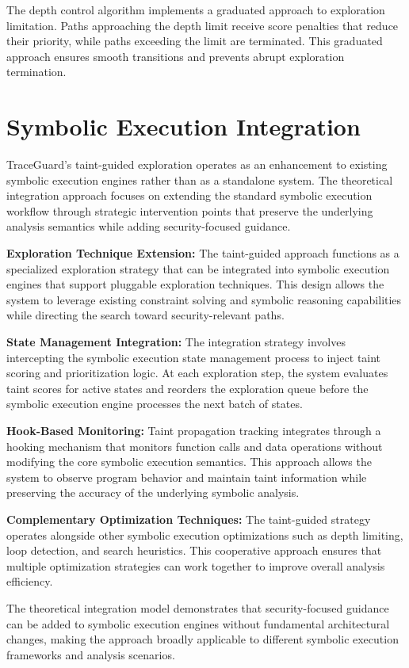 The depth control algorithm implements a graduated approach to exploration limitation. Paths approaching the depth limit receive score penalties that reduce their priority, while paths exceeding the limit are terminated. This graduated approach ensures smooth transitions and prevents abrupt exploration termination.

\section{Symbolic Execution Integration}

TraceGuard's taint-guided exploration operates as an enhancement to existing symbolic execution engines rather than as a standalone system. The theoretical integration approach focuses on extending the standard symbolic execution workflow through strategic intervention points that preserve the underlying analysis semantics while adding security-focused guidance.

\textbf{Exploration Technique Extension:} The taint-guided approach functions as a specialized exploration strategy that can be integrated into symbolic execution engines that support pluggable exploration techniques. This design allows the system to leverage existing constraint solving and symbolic reasoning capabilities while directing the search toward security-relevant paths.

\textbf{State Management Integration:} The integration strategy involves intercepting the symbolic execution state management process to inject taint scoring and prioritization logic. At each exploration step, the system evaluates taint scores for active states and reorders the exploration queue before the symbolic execution engine processes the next batch of states.

\textbf{Hook-Based Monitoring:} Taint propagation tracking integrates through a hooking mechanism that monitors function calls and data operations without modifying the core symbolic execution semantics. This approach allows the system to observe program behavior and maintain taint information while preserving the accuracy of the underlying symbolic analysis.

\textbf{Complementary Optimization Techniques:} The taint-guided strategy operates alongside other symbolic execution optimizations such as depth limiting, loop detection, and search heuristics. This cooperative approach ensures that multiple optimization strategies can work together to improve overall analysis efficiency.

The theoretical integration model demonstrates that security-focused guidance can be added to symbolic execution engines without fundamental architectural changes, making the approach broadly applicable to different symbolic execution frameworks and analysis scenarios.
